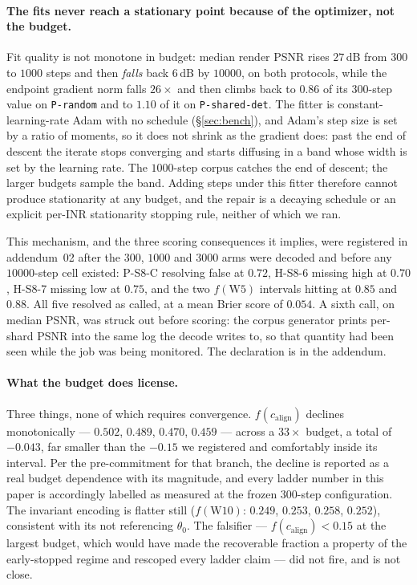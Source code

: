 \documentclass[10pt,letterpaper]{article}
\theoremstyle{definition}
\newcommand{\calign}{c_{\mathrm{align}}}
\begin{document}
\paragraph{The fits never reach a stationary point because of the optimizer, not the budget.} Fit
quality is not monotone in budget: median render PSNR rises $27$\,dB from $300$ to $1000$ steps and
then \emph{falls} back $6$\,dB by $10000$, on both protocols, while the endpoint gradient norm falls
$26\times$ and then climbs back to $0.86$ of its $300$-step value on \texttt{P-random} and to
$1.10$ of it on \texttt{P-shared-det}. The fitter is constant-learning-rate Adam
with no schedule (\S\ref{sec:bench}), and Adam's step size is set by a ratio of moments, so it
does not shrink as the gradient does: past the end of descent the iterate stops converging and
starts diffusing in a band whose width is set by the learning rate. The $1000$-step corpus catches
the end of descent; the larger budgets sample the band. Adding steps under this fitter therefore
cannot produce stationarity at any budget, and the repair is a decaying schedule or an explicit
per-INR stationarity stopping rule, neither of which we ran.

This mechanism, and the three scoring consequences it implies, were registered in addendum~02 after
the $300$, $1000$ and $3000$ arms were decoded and before any $10000$-step cell existed: P-S8-C
resolving false at $0.72$, H-S8-6 missing high at $0.70$, H-S8-7 missing low at $0.75$, and the two
$f(\mathrm{W5})$ intervals hitting at $0.85$ and $0.88$. All five resolved as called, at a mean
Brier score of $0.054$. A sixth call, on median PSNR, was struck out
before scoring: the corpus generator prints per-shard PSNR into the same log the decode writes to,
so that quantity had been seen while the job was being monitored. The declaration is in the
addendum.

\paragraph{What the budget does license.} Three things, none of which requires convergence.
$f(\calign)$ declines monotonically --- $0.502$, $0.489$, $0.470$, $0.459$ --- across a $33\times$
budget, a total of $\mathbf{-0.043}$, far smaller than the $-0.15$ we registered and comfortably
inside its interval. Per the pre-commitment for that branch, the decline is reported as a real
budget dependence with its magnitude, and every ladder number in this paper is accordingly labelled
as measured at the frozen $300$-step configuration. The invariant encoding is flatter still
($f(\mathrm{W10})$: $0.249$, $0.253$, $0.258$, $0.252$), consistent with its not referencing
$\theta_0$. The falsifier --- $f(\calign) < 0.15$ at the largest budget, which would have made the
recoverable fraction a property of the early-stopped regime and rescoped every ladder claim --- did
not fire, and is not close.
\end{document}

